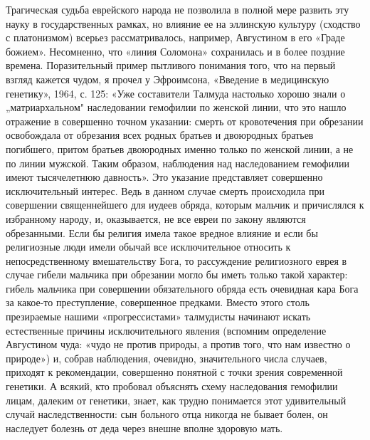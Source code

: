 Трагическая  судьба  еврейского  народа  не позволила  в  полной  мере
развить эту науку в государственных рамках, но влияние ее на эллинскую
культуру (сходство  с платонизмом) всерьез  рассматривалось, например,
Августином  в его  «Граде  божием». Несомненно,  что «линия  Соломона»
сохранилась и в более  поздние времена. Поразительный пример пытливого
понимания  того,  что  на  первый   взгляд  кажется  чудом,  я  прочел
у  Эфроимсона,  «Введение  в  медицинскую  генетику»,  1964,  с.  125:
«Уже  составители Талмуда  настолько хорошо  знали о  „матриархальном"
наследовании гемофилии  по женской  линии, что  это нашло  отражение в
совершенно  точном  указании:  смерть от  кровотечения  при  обрезании
освобождала  от обрезания  всех  родных братьев  и двоюродных  братьев
погибшего, притом братьев двоюродных именно только по женской линии, а
не  по  линии мужской.  Таким  образом,  наблюдения над  наследованием
гемофилии  имеют  тысячелетнюю  давность». Это  указание  представляет
совершенно  исключительный  интерес.  Ведь   в  данном  случае  смерть
происходила при  совершении священнейшего  для иудеев  обряда, которым
мальчик  и  причислялся  к   избранному  народу,  и,  оказывается,  не
все  евреи  по закону  являются  обрезанными.  Если бы  религия  имела
такое  вредное  влияние  и  если  бы  религиозные  люди  имели  обычай
все  исключительное относить  к непосредственному  вмешательству Бога,
то  рассуждение  религиозного  еврея  в  случае  гибели  мальчика  при
обрезании могло  бы иметь только  такой характер: гибель  мальчика при
совершении обязательного  обряда есть очевидная кара  Бога за какое-то
преступление,  совершенное предками.  Вместо  этого столь  презираемые
нашими  «прогрессистами»   талмудисты  начинают   искать  естественные
причины исключительного явления (вспомним определение Августином чуда:
«чудо не против  природы, а против того, что нам  известно о природе»)
и, собрав наблюдения, очевидно,  значительного числа случаев, приходят
к  рекомендации,  совершенно  понятной   с  точки  зрения  современной
генетики.  А   всякий,  кто  пробовал  объяснять   схему  наследования
гемофилии  лицам, далеким  от генетики,  знает, как  трудно понимается
этот удивительный  случай наследственности: сын больного  отца никогда
не  бывает болен,  он наследует  болезнь от  деда через  внешне вполне
здоровую мать.

